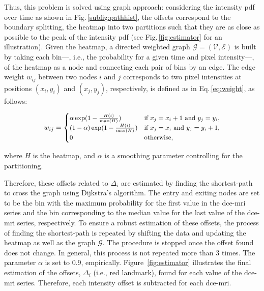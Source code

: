 \documentclass[final,3p,times,twocolumn]{elsarticle}
\begin{document}
Thus, this problem is solved using graph approach: considering the intensity
\ac{pdf} over time as shown in Fig.\,\ref{subfig:pathhist}, the offsets
correspond to the boundary splitting, the heatmap into two partitions such that
they are as close as possible to the peak of the intensity \ac{pdf} (see
Fig.\,\ref{fig:estimator} for an illustration). Given the heatmap, a directed
weighted graph $\mathcal{G}=(\mathcal{V}, \mathcal{E})$ is built by taking each
bin---, i.e., the probability for a given time and pixel intensity---, of the
heatmap as a node and connecting each pair of bins by an edge. The edge weight
$w_{ij}$ between two nodes $i$ and $j$ corresponds to two pixel intensities at
positions $(x_i, y_i)$ and $(x_j, y_j)$, respectively, is defined as in
Eq.\,\eqref{eq:weight}, as follows:

\begin{equation}\small
  w_{ij} = \begin{cases}
    \alpha \exp(1 - \frac{H(i)}{\max(H)})       & \text{if } x_j = x_i + 1 \text{ and } y_j = y_i, \\
    (1 - \alpha) \exp(1 - \frac{H(i)}{\max(H)}) & \text{if } x_j = x_i \text{ and } y_j = y_i + 1, \\
    0                                           & \text{otherwise},
  \end{cases}
  \label{eq:weight}
\end{equation}

\noindent where $H$ is the heatmap, and $\alpha$ is a smoothing parameter
controlling for the partitioning.

Therefore, these offsets related to $\Delta_i$ are estimated by finding the
shortest-path to cross the graph using Dijkstra's algorithm.  The entry and
exiting nodes are set to be the bin with the maximum probability for the first
value in the \ac{dce}-\ac{mri} series and the bin corresponding to the median
value for the last value of the \ac{dce}-\ac{mri} series, respectively.  To
ensure a robust estimation of these offsets, the process of finding the
shortest-path is repeated by shifting the data and updating the heatmap as well
as the graph $\mathcal{G}$. The procedure is stopped once the offset found does
not change. In general, this process is not repeated more than 3 times.  The
parameter $\alpha$ is set to $0.9$, empirically. Figure~\ref{fig:estimator}
illustrates the final estimation of the offsets, $\Delta_i$ (i.e., red
landmark), found for each value of the \ac{dce}-\ac{mri} series. Therefore,
each intensity offset is subtracted for each \ac{dce}-\ac{mri}.
\end{document}
